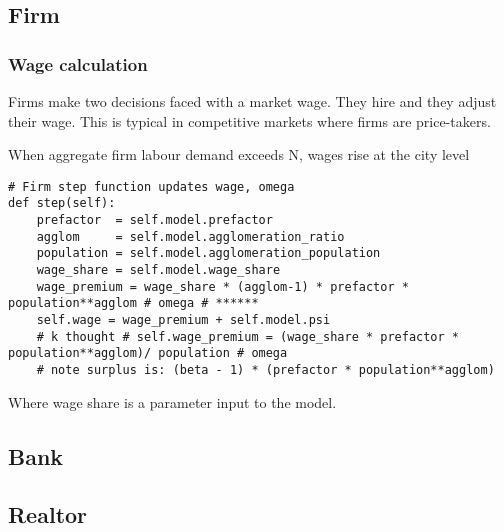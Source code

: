 \subsection{Firm}

\subsubsection{Wage calculation}
Firms make two decisions faced with a market wage. They hire and they adjust their
wage. This is typical in \glspl{competitive market} where firms are price-takers. 


When aggregate firm labour demand exceeds N, wages rise at the city level
\begin{lstlisting}
# Firm step function updates wage, omega
def step(self):
    prefactor  = self.model.prefactor
    agglom     = self.model.agglomeration_ratio
    population = self.model.agglomeration_population
    wage_share = self.model.wage_share  
    wage_premium = wage_share * (agglom-1) * prefactor * population**agglom # omega # ****** 
    self.wage = wage_premium + self.model.psi
    # k thought # self.wage_premium = (wage_share * prefactor * population**agglom)/ population # omega    
    # note surplus is: (beta - 1) * (prefactor * population**agglom)
\end{lstlisting}

Where wage share is a parameter input to the model.


\subsection{Bank}


\subsection{Realtor}



